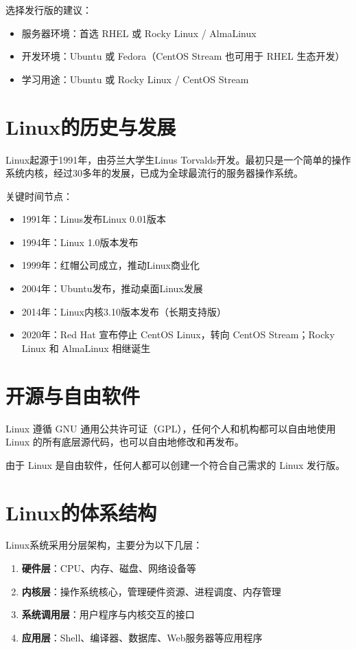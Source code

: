 \documentclass[12pt,UTF8]{ctexbook}
\begin{document}
选择发行版的建议：
\begin{itemize}
    \item 服务器环境：首选 RHEL 或 Rocky Linux / AlmaLinux
    \item 开发环境：Ubuntu 或 Fedora（CentOS Stream 也可用于 RHEL 生态开发）
    \item 学习用途：Ubuntu 或 Rocky Linux / CentOS Stream
\end{itemize}

\section{Linux的历史与发展}
\label{sec:history}

Linux起源于1991年，由芬兰大学生Linus Torvalds开发。最初只是一个简单的操作系统内核，经过30多年的发展，已成为全球最流行的服务器操作系统。

关键时间节点：
\begin{itemize}
    \item 1991年：Linus发布Linux 0.01版本
    \item 1994年：Linux 1.0版本发布
    \item 1999年：红帽公司成立，推动Linux商业化
    \item 2004年：Ubuntu发布，推动桌面Linux发展
    \item 2014年：Linux内核3.10版本发布（长期支持版）
    \item 2020年：Red Hat 宣布停止 CentOS Linux，转向 CentOS Stream；Rocky Linux 和 AlmaLinux 相继诞生
\end{itemize}

\section{开源与自由软件}
\label{sec:opensource}

Linux 遵循 GNU 通用公共许可证（GPL），任何个人和机构都可以自由地使用 Linux 的所有底层源代码，也可以自由地修改和再发布。

由于 Linux 是自由软件，任何人都可以创建一个符合自己需求的 Linux 发行版。

\section{Linux的体系结构}
\label{sec:architecture}

Linux系统采用分层架构，主要分为以下几层：

\begin{enumerate}
    \item \textbf{硬件层}：CPU、内存、磁盘、网络设备等
    \item \textbf{内核层}：操作系统核心，管理硬件资源、进程调度、内存管理
    \item \textbf{系统调用层}：用户程序与内核交互的接口
    \item \textbf{应用层}：Shell、编译器、数据库、Web服务器等应用程序
\end{enumerate}
\end{document}
